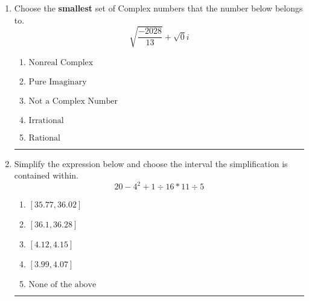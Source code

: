 \documentclass[14pt]{extbook}
\newcommand{\litem}[1]{\item#1\hspace*{-1cm}\rule{\textwidth}{0.4pt}}
\begin{document}
\begin{enumerate}
{\begin{enumerate}[label=\Alph*.]
\end{enumerate} }
\litem{
Choose the \textbf{smallest} set of Complex numbers that the number below belongs to.\[ \sqrt{\frac{-2028}{13}}+\sqrt{0}i \]\begin{enumerate}[label=\Alph*.]
\item \( \text{Nonreal Complex} \)
\item \( \text{Pure Imaginary} \)
\item \( \text{Not a Complex Number} \)
\item \( \text{Irrational} \)
\item \( \text{Rational} \)

\end{enumerate} }
\litem{
Simplify the expression below and choose the interval the simplification is contained within.\[ 20 - 4^2 + 1 \div 16 * 11 \div 5 \]\begin{enumerate}[label=\Alph*.]
\item \( [35.77, 36.02] \)
\item \( [36.1, 36.28] \)
\item \( [4.12, 4.15] \)
\item \( [3.99, 4.07] \)
\item \( \text{None of the above} \)

\end{enumerate} }
\end{enumerate}
\end{document}
